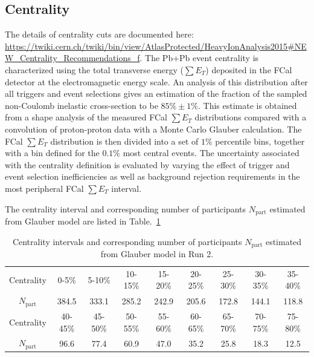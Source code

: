 \subsection{Centrality}
The details of centrality cuts are documented here: \url{https://twiki.cern.ch/twiki/bin/view/AtlasProtected/HeavyIonAnalysis2015#NEW\_Centrality\_Recommendations\_f}. The Pb+Pb event centrality is characterized using the total transverse energy ($\sum E_T$) deposited in the FCal detector at the electromagnetic energy scale. An analysis of this distribution after all triggers and event selections gives an estimation of the fraction of the sampled non-Coulomb inelastic cross-section to be $85\%\pm1\%$. This estimate is obtained from a shape analysis of the measured FCal $\sum E_T$ distributions compared with a convolution of proton-proton data with a Monte Carlo Glauber calculation. The FCal $\sum E_T$ distribution is then divided into a set of $1\%$ percentile bins, together with a bin defined for the $0.1\%$ most central events. The uncertainty associated with the centrality definition is evaluated by varying the effect of trigger and event selection inefficiencies as well as background rejection requirements in the most peripheral FCal $\sum E_T$ interval.

The centrality interval and corresponding number of participants $N_{\text{part}}$ estimated from Glauber model are listed in Table.~\ref{table:centrality_run2}
\begin{table}[ht]
\begin{tabular}{c c c c c c c c c}
\hline\hline
Centrality        &  0-5\% & 5-10\% & 10-15\% & 15-20\% & 20-25\% & 25-30\% & 30-35\% & 35-40\% \\
$N_{\text{part}}$ &  384.5 & 333.1  & 285.2   & 242.9   & 205.6   & 172.8   & 144.1   & 118.8   \\
Centrality        &40-45\% & 45-50\%& 50-55\% & 55-60\% & 60-65\% & 65-70\%  & 70-75\%& 75-80\% \\ 
$N_{\text{part}}$ &96.6    & 77.4    & 60.9    & 47.0    & 35.2    & 25.8     & 18.3   & 12.5 \\
\hline
\end{tabular}
\centering
\caption{Centrality intervals and corresponding number of participants $N_{\text{part}}$ estimated from Glauber model in Run 2.}
\label{table:centrality_run2}
\end{table}

